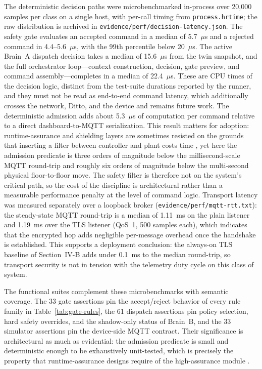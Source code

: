 \documentclass[journal]{IEEEtran}
\newcommand{\artifact}[1]{\texttt{#1}}
\begin{document}
The deterministic decision paths were microbenchmarked in-process over 20{,}000 samples per class on a single host, with per-call timing from \artifact{process.hrtime}; the raw distribution is archived in \artifact{evidence/perf/decision-latency.json}. The safety gate evaluates an accepted command in a median of 5.7~$\mu$s and a rejected command in 4.4--5.6~$\mu$s, with the 99th percentile below 20~$\mu$s. The active Brain~A dispatch decision takes a median of 15.6~$\mu$s from the twin snapshot, and the full orchestrator loop---context construction, decision, gate preview, and command assembly---completes in a median of 22.4~$\mu$s. These are CPU times of the decision logic, distinct from the test-suite durations reported by the runner, and they must not be read as end-to-end command latency, which additionally crosses the network, Ditto, and the device and remains future work. The deterministic admission adds about 5.3~$\mu$s of computation per command relative to a direct dashboard-to-MQTT serialization. This result matters for adoption: runtime-assurance and shielding layers are sometimes resisted on the grounds that inserting a filter between controller and plant costs time \cite{sha2001simplex,alshiekh2018shielding}, yet here the admission predicate is three orders of magnitude below the millisecond-scale MQTT round-trip and roughly six orders of magnitude below the multi-second physical floor-to-floor move. The safety filter is therefore not on the system's critical path, so the cost of the discipline is architectural rather than a measurable performance penalty at the level of command logic. Transport latency was measured separately over a loopback broker (\artifact{evidence/perf/mqtt-rtt.txt}): the steady-state MQTT round-trip is a median of 1.11~ms on the plain listener and 1.19~ms over the TLS listener (QoS~1, 500 samples each), which indicates that the encrypted hop adds negligible per-message overhead once the handshake is established. This supports a deployment conclusion: the always-on TLS baseline of Section~IV-B adds under 0.1~ms to the median round-trip, so transport security is not in tension with the telemetry duty cycle on this class of system.

The functional suites complement these microbenchmarks with semantic coverage. The 33 gate assertions pin the accept/reject behavior of every rule family in Table~\ref{tab:gate-rules}, the 61 dispatch assertions pin policy selection, hard safety overrides, and the shadow-only status of Brain~B, and the 33 simulator assertions pin the device-side MQTT contract. Their significance is architectural as much as evidential: the admission predicate is small and deterministic enough to be exhaustively unit-tested, which is precisely the property that runtime-assurance designs require of the high-assurance module \cite{sha2001simplex}.
\end{document}
